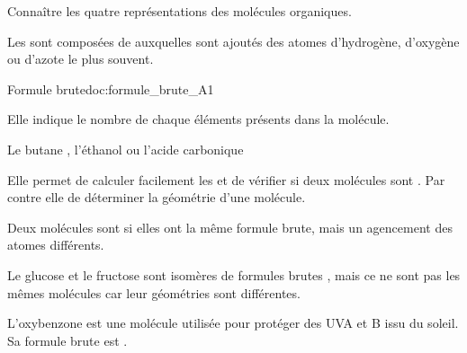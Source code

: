 \tetePremStssStru

\vspace*{-30pt}


\begin{objectifs}
  \item Connaître les quatre représentations des molécules organiques.
\end{objectifs}

\begin{contexte}
  Les  sont composées de  auxquelles sont ajoutés des atomes d'hydrogène, d'oxygène ou d'azote le plus souvent.
  
\end{contexte}

\vspace*{-12pt}

\vspace*{-8pt}
\begin{doc}{Formule brute}{doc:formule_brute_A1}
  \begin{encart}
    Elle indique le nombre de chaque éléments présents dans la molécule.
  \end{encart}
  \exemple Le butane , l'éthanol  ou l'acide carbonique 
  
  Elle permet de calculer facilement les  et de vérifier si deux molécules sont .
  Par contre elle  de déterminer la géométrie d'une molécule.

  \begin{encart}
    Deux molécules sont  si elles ont la même formule brute, mais un agencement des atomes différents.
  \end{encart}
  \exemple Le glucose et le fructose sont isomères de formules brutes , mais ce ne sont pas les mêmes molécules car leur géométries sont différentes.
\end{doc}

L'oxybenzone est une molécule utilisée pour protéger des UVA et B issu du soleil.
Sa formule brute est .


